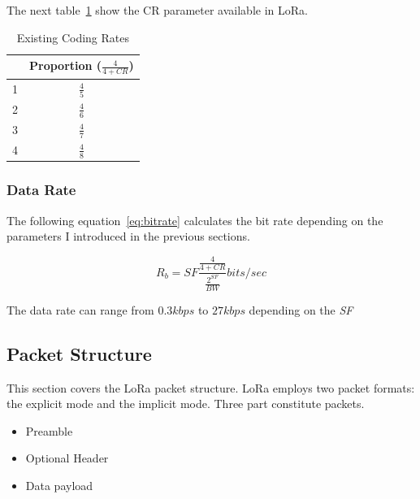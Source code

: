 The next table~\ref{table:cr} show the CR parameter available in LoRa.

\begin{table}[h!]
\centering
\begin{tabular}{|c|c|}
\hline
\rowcolor[HTML]{C0C0C0} 
  \multicolumn{1}{|c|}{\cellcolor[HTML]{C0C0C0}CR} & Proportion ($\frac{4}{4 + CR}$) \\ \hline
1                                                & $\frac{4}{5}$\\ \hline
2                                                & $\frac{4}{6}$\\ \hline
3                                                & $\frac{4}{7}$\\ \hline
4                                                & $\frac{4}{8}$\\ \hline
\end{tabular}
  \caption{Existing Coding Rates\label{table:cr}}
\end{table}

\subsubsection{Data Rate}

The following equation~\ref{eq:bitrate} calculates the bit rate depending on the
parameters I introduced in the previous sections\cite{semtech:modulationbasics}.

\begin{equation}
 \label{eq:bitrate} 
  R_{b} = SF \frac{\frac{4}{4 + CR}}{\frac{2^{SF}}{BW}} bits/sec
\end{equation}

The data rate can range from $0.3 kbps$ to $27 kbps$ depending on the \emph{SF} %


\subsection{Packet Structure}

This section covers the LoRa packet structure. LoRa employs two packet formats: 
the explicit mode and the implicit mode.
Three part constitute packets.

\begin{itemize}
  \item Preamble
  \item Optional Header
  \item Data payload
\end{itemize}

